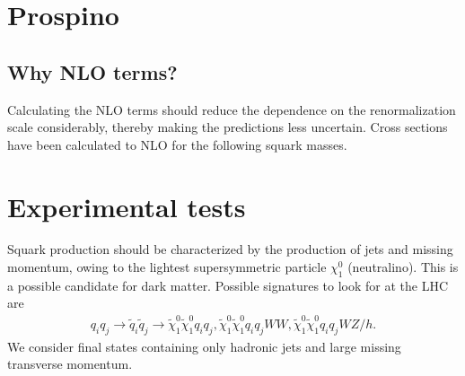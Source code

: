 \documentclass[11pt]{article}
\begin{document}
\pagebreak

\section{Prospino}
\subsection*{Why NLO terms?}
\begin{flushleft}
Calculating the NLO terms should reduce the dependence on the renormalization scale considerably, thereby making the predictions less uncertain. Cross sections have been calculated to NLO for the following squark masses.
\end{flushleft}

\section{Experimental tests}
\begin{flushleft}
Squark production should be characterized by the production of jets and missing momentum, owing to the lightest supersymmetric particle $\chi_1^0$ (neutralino). This is a possible candidate for dark matter. Possible signatures to look for at the LHC are
\begin{align*}
q_iq_j \rightarrow \tilde{q}_i \tilde{q}_j \rightarrow \tilde{\chi}_1^0 \tilde{\chi}_1^0 q_i q_j, \tilde{\chi}_1^0 \tilde{\chi}_1^0 q_i q_j WW, \tilde{\chi}_1^0 \tilde{\chi}_1^0 q_i q_j W Z/h.
\end{align*}
We consider final states containing only hadronic jets and large missing transverse momentum.
\begin{figure}[H]
\end{figure}
\end{flushleft}




\end{document}
